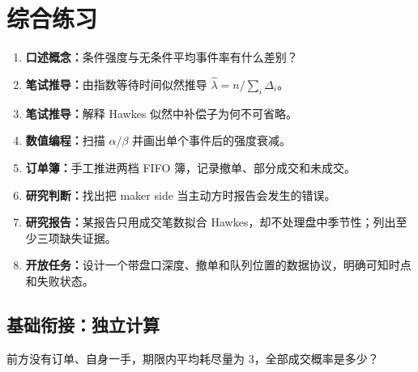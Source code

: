 \section{综合练习}
\begin{enumerate}[leftmargin=*]
  \item \textbf{口述概念：}条件强度与无条件平均事件率有什么差别？
  \item \textbf{笔试推导：}由指数等待时间似然推导 $\widehat\lambda=n/\sum_i\Delta_i$。
  \item \textbf{笔试推导：}解释 Hawkes 似然中补偿子为何不可省略。
  \item \textbf{数值编程：}扫描 $\alpha/\beta$ 并画出单个事件后的强度衰减。
  \item \textbf{订单簿：}手工推进两档 FIFO 簿，记录撤单、部分成交和未成交。
  \item \textbf{研究判断：}找出把 maker side 当主动方时报告会发生的错误。
  \item \textbf{研究报告：}某报告只用成交笔数拟合 Hawkes，却不处理盘中季节性；列出至少三项缺失证据。
  \item \textbf{开放任务：}设计一个带盘口深度、撤单和队列位置的数据协议，明确可知时点和失败状态。
\end{enumerate}

\subsection*{基础衔接：独立计算}
前方没有订单、自身一手，期限内平均耗尽量为 3，全部成交概率是多少？
